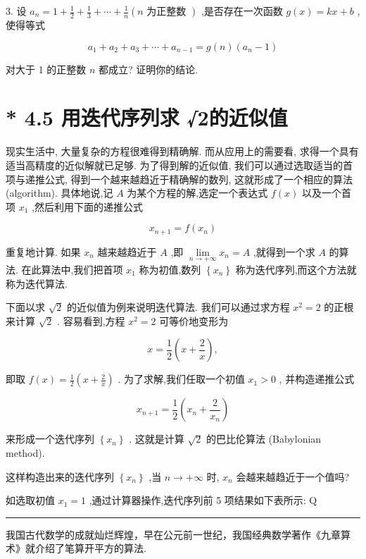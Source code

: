 \documentclass[10pt]{article}
\newcommand{\HRule}{\begin{center}\rule{0.9\linewidth}{0.2mm}\end{center}}
\begin{document}
3. 设 \({a}_{n} = 1 + \frac{1}{2} + \frac{1}{3} + \cdots  + \frac{1}{n}\left( {n\text{ 为正整数 }}\right)\) ,是否存在一次函数 \(g\left( x\right)  = {kx} + b\) ,使得等式

\[
{a}_{1} + {a}_{2} + {a}_{3} + \cdots  + {a}_{n - 1} = g\left( n\right) \left( {{a}_{n} - 1}\right)
\]

对大于 1 的正整数 \(n\) 都成立? 证明你的结论.

\section*{* 4.5 用迭代序列求 √2的近似值}

现实生活中, 大量复杂的方程很难得到精确解. 而从应用上的需要看, 求得一个具有适当高精度的近似解就已足够. 为了得到解的近似值, 我们可以通过选取适当的首项与递推公式, 得到一个越来越趋近于精确解的数列, 这就形成了一个相应的算法 (algorithm). 具体地说,记 \(A\) 为某个方程的解,选定一个表达式 \(f\left( x\right)\) 以及一个首项 \({x}_{1}\) ,然后利用下面的递推公式

\[
{x}_{n + 1} = f\left( {x}_{n}\right)
\]

重复地计算. 如果 \({x}_{n}\) 越来越趋近于 \(A\) ,即 \(\mathop{\lim }\limits_{{n \rightarrow   + \infty }}{x}_{n} = A\) ,就得到一个求 \(A\) 的算法. 在此算法中,我们把首项 \({x}_{1}\) 称为初值,数列 \(\left\{  {x}_{n}\right\}\) 称为迭代序列,而这个方法就称为迭代算法.

下面以求 \(\sqrt{2}\) 的近似值为例来说明迭代算法. 我们可以通过求方程 \({x}^{2} = 2\) 的正根来计算 \(\sqrt{2}\) . 容易看到,方程 \({x}^{2} = 2\) 可等价地变形为

\[
x = \frac{1}{2}\left( {x + \frac{2}{x}}\right) ,
\]

即取 \(f\left( x\right)  = \frac{1}{2}\left( {x + \frac{2}{x}}\right)\) . 为了求解,我们任取一个初值 \({x}_{1} > 0\) , 并构造递推公式

\[
{x}_{n + 1} = \frac{1}{2}\left( {{x}_{n} + \frac{2}{{x}_{n}}}\right)
\]

来形成一个迭代序列 \(\left\{  {x}_{n}\right\}\) . 这就是计算 \(\sqrt{2}\) 的巴比伦算法 (Babylonian method).

这样构造出来的迭代序列 \(\left\{  {x}_{n}\right\}\) ,当 \(n \rightarrow   + \infty\) 时, \({x}_{n}\) 会越来越趋近于一个值吗?

如选取初值 \({x}_{1} = 1\) ,通过计算器操作,迭代序列前 5 项结果如下表所示: Q

\HRule

我国古代数学的成就灿烂辉煌，早在公元前一世纪，我国经典数学著作《九章算术》就介绍了笔算开平方的算法.
\end{document}
